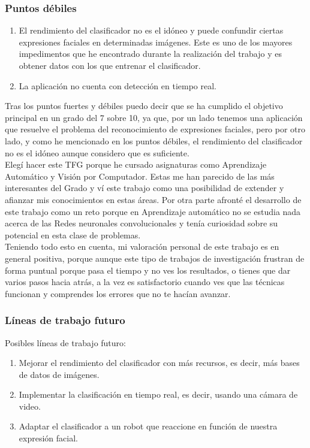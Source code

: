 \documentclass[a4paper,11pt]{book}
\begin{document}
\subsubsection{Puntos débiles}
\begin{enumerate}
	\item El rendimiento del clasificador no es el idóneo y puede confundir ciertas expresiones faciales en determinadas imágenes. Este es uno de los mayores impedimentos que he encontrado durante la realización del trabajo y es obtener datos con los que entrenar el clasificador.
	\item La aplicación no cuenta con detección en tiempo real.
\end{enumerate}
Tras los puntos fuertes y débiles puedo decir que se ha cumplido el objetivo principal en un grado del 7 sobre 10, ya que, por un lado tenemos una aplicación que resuelve el problema del reconocimiento de expresiones faciales, pero por otro lado, y como he mencionado en los puntos débiles, el rendimiento del clasificador no es el idóneo aunque considero que es suficiente.\\
Elegí hacer este TFG porque he cursado asignaturas como Aprendizaje Automático y Visión por Computador. Estas me han parecido de las más interesantes del Grado y ví este trabajo como una posibilidad de extender y afianzar mis conocimientos en estas áreas. Por otra parte afronté el desarrollo de este trabajo como un reto porque en Aprendizaje automático no se estudia nada acerca de las Redes neuronales convolucionales y tenía curiosidad sobre su potencial en esta clase de problemas.\\
Teniendo todo esto en cuenta, mi valoración personal de este trabajo es en general positiva, porque aunque este tipo de trabajos de investigación frustran de forma puntual porque pasa el tiempo y no ves los resultados, o tienes que dar varios pasos hacia atrás, a la vez es satisfactorio cuando ves que las técnicas funcionan y comprendes los errores que no te hacían avanzar.\\


\subsubsection{Líneas de trabajo futuro}
Posibles líneas de trabajo futuro:
\begin{enumerate}
	\item Mejorar el rendimiento del clasificador con más recursos, es decir, más bases de datos de imágenes.
	\item Implementar la clasificación en tiempo real, es decir, usando una cámara de video.
	\item Adaptar el clasificador a un robot que reaccione en función de nuestra expresión facial.
\end{enumerate}
\end{document}
